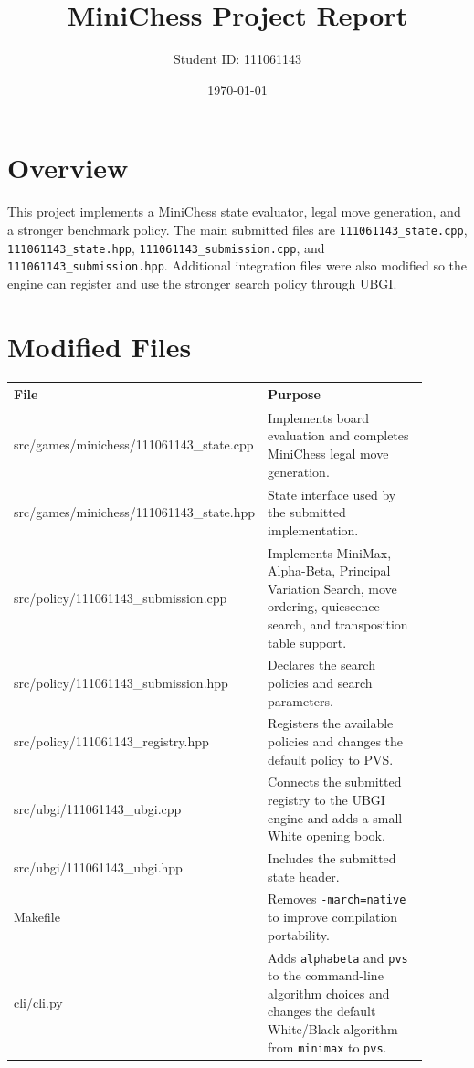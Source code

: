 \documentclass[11pt,a4paper]{article}
\title{MiniChess Project Report}
\author{Student ID: 111061143}
\date{\today}
\begin{document}
\maketitle

\section{Overview}

This project implements a MiniChess state evaluator, legal move generation, and
a stronger benchmark policy. The main submitted files are
\texttt{111061143\_state.cpp}, \texttt{111061143\_state.hpp},
\texttt{111061143\_submission.cpp}, and \texttt{111061143\_submission.hpp}.
Additional integration files were also modified so the engine can register and
use the stronger search policy through UBGI.

\section{Modified Files}

\begin{center}
\begin{tabular}{>{\ttfamily}p{0.42\linewidth}p{0.48\linewidth}}
\toprule
File & Purpose \\
\midrule
src/games/minichess/111061143\_state.cpp &
Implements board evaluation and completes MiniChess legal move generation. \\
src/games/minichess/111061143\_state.hpp &
State interface used by the submitted implementation. \\
src/policy/111061143\_submission.cpp &
Implements MiniMax, Alpha-Beta, Principal Variation Search, move ordering,
quiescence search, and transposition table support. \\
src/policy/111061143\_submission.hpp &
Declares the search policies and search parameters. \\
src/policy/111061143\_registry.hpp &
Registers the available policies and changes the default policy to PVS. \\
src/ubgi/111061143\_ubgi.cpp &
Connects the submitted registry to the UBGI engine and adds a small White
opening book. \\
src/ubgi/111061143\_ubgi.hpp &
Includes the submitted state header. \\
Makefile &
Removes \texttt{-march=native} to improve compilation portability. \\
cli/cli.py &
Adds \texttt{alphabeta} and \texttt{pvs} to the command-line algorithm choices
and changes the default White/Black algorithm from \texttt{minimax} to
\texttt{pvs}. \\
\bottomrule
\end{tabular}
\end{center}
\end{document}
